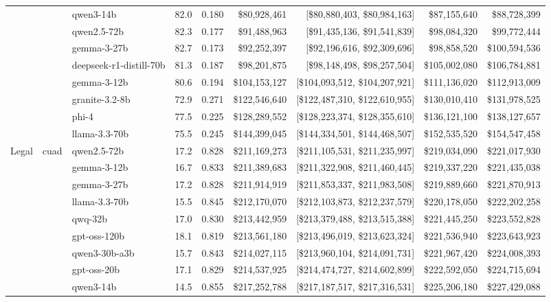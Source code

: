 \begin{table}[t]
\begin{tabular}{lllrrrrrr}
   &  & qwen3-14b & 82.0 & 0.180 & \$80,928,461 & [\$80,880,403, \$80,984,163] & \$87,155,640 & \$88,728,399 \\
   &  & qwen2.5-72b & 82.3 & 0.177 & \$91,488,963 & [\$91,435,136, \$91,541,839] & \$98,084,320 & \$99,772,444 \\
   &  & gemma-3-27b & 82.7 & 0.173 & \$92,252,397 & [\$92,196,616, \$92,309,696] & \$98,858,520 & \$100,594,536 \\
   &  & deepseek-r1-distill-70b & 81.3 & 0.187 & \$98,201,875 & [\$98,148,498, \$98,257,504] & \$105,002,080 & \$106,784,881 \\
   &  & gemma-3-12b & 80.6 & 0.194 & \$104,153,127 & [\$104,093,512, \$104,207,921] & \$111,136,020 & \$112,913,009 \\
   &  & granite-3.2-8b & 72.9 & 0.271 & \$122,546,640 & [\$122,487,310, \$122,610,955] & \$130,010,410 & \$131,978,525 \\
   &  & phi-4 & 77.5 & 0.225 & \$128,289,552 & [\$128,223,374, \$128,355,610] & \$136,121,100 & \$138,127,657 \\
   &  & llama-3.3-70b & 75.5 & 0.245 & \$144,399,045 & [\$144,334,501, \$144,468,507] & \$152,535,520 & \$154,547,458 \\
\midrule
  Legal & cuad & qwen2.5-72b & 17.2 & 0.828 & \$211,169,273 & [\$211,105,531, \$211,235,997] & \$219,034,090 & \$221,017,930 \\
   &  & gemma-3-12b & 16.7 & 0.833 & \$211,389,683 & [\$211,322,908, \$211,460,445] & \$219,337,220 & \$221,435,038 \\
   &  & gemma-3-27b & 17.2 & 0.828 & \$211,914,919 & [\$211,853,337, \$211,983,508] & \$219,889,660 & \$221,870,913 \\
   &  & llama-3.3-70b & 15.5 & 0.845 & \$212,170,070 & [\$212,103,873, \$212,237,579] & \$220,178,050 & \$222,202,258 \\
   &  & qwq-32b & 17.0 & 0.830 & \$213,442,959 & [\$213,379,488, \$213,515,388] & \$221,445,250 & \$223,552,828 \\
   &  & gpt-oss-120b & 18.1 & 0.819 & \$213,561,180 & [\$213,496,019, \$213,623,324] & \$221,536,940 & \$223,643,923 \\
   &  & qwen3-30b-a3b & 15.7 & 0.843 & \$214,027,115 & [\$213,960,104, \$214,091,731] & \$221,967,420 & \$224,008,393 \\
   &  & gpt-oss-20b & 17.1 & 0.829 & \$214,537,925 & [\$214,474,727, \$214,602,899] & \$222,592,050 & \$224,715,694 \\
   &  & qwen3-14b & 14.5 & 0.855 & \$217,252,788 & [\$217,187,517, \$217,316,531] & \$225,206,180 & \$227,429,088 \\

\end{tabular}
\end{table}
